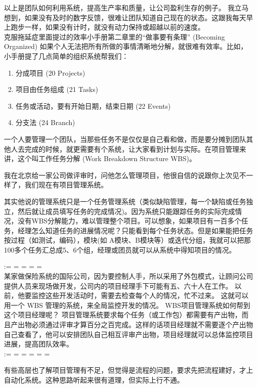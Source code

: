 以上是团队如何利用系统，提高生产率和质量，让公司盈利生存的例子。
我立马想到，如果没有及时的数字反馈，很难让团队知道自己现在的状态。这跟我每天早上跑步一样，如果没有计时，就没有动力保持或超越以前的速度。\\
克服拖延症里面提过的效率小手册第二章里的“做事要有条理” (Becoming Organized)
如果个人无法把所有所做的事情清晰地分解，就很难有效率。比如，小手册提了几点简单的组织系统帮我们：

\begin{enumerate}
\tightlist
\item
  分成项目 (20 Projects)
\item
  项目由任务组成 (21 Tasks)
\item
  任务或活动，要有开始日期，结束日期 (22 Events)
\item
  分支法 (24 Branch)
\end{enumerate}

一个人要管理一个团队，当那些任务不是仅仅是自己看和做，而是要分摊到团队其他人去完成的时候，就更需要有个系统，让大家看到计划与实际。在项目管理来讲，这个叫工作任务分解
(Work Breakdown Structure WBS)。

我在北京给一家公司做评审时，问他怎么管理项目，他很自信的说跟你上次见不一样了，我们现在有项目管理系统。

其实他说的管理系统只是一个任务管理系统（类似缺陷管理，每一个缺陷或任务独立，然后就让成员填写任务的完成情况)。因为系统只能跟踪任务的实际完成情况，没有WBS分解能力，难以管理整个项目。可以想象，如果项目有一百多个任务，经理怎么知道任务的进展情况呢？只能看到每个任务状态。但是如果能把任务按过程（如测试，编码），模块(如
A模块、B模块等）或迭代分组，我就可以把那100多个任务汇总成5、6个组，经理或团员就可以从系统中得知项目的情况。

:= = = = =\\

某家做保险系统的国际公司，因为要控制人手，所以采用了外包模式，让顾问公司提供人员来现场做开发，公司内的项目经理手下可能有五、六十人在工作。
以前，他要监控这些开发活动时，需要去检查每个人的情况，忙不过来。
这就可以用一个 WBS 管理的系统，来全局监控开发的情况。
WBS项目管理系统如何帮到这个项目经理呢？
项目管理系统要求每个任务（或工作包）都需要有产出物，而且产出物必须通过评审才算百分之百完成。这样的话项目经理就不需要逐个产出物自己查看了，他可以安排团队自己相互评审产出物，项目经理就可以总体监控项目进展，提高团队效率。\\

:= = = = = =

有些高层也了解项目管理有不足，但觉得是流程的问题，要求先把流程建好，才上自动化系统。这种思路听起来很有道理，但实际上行不通。

